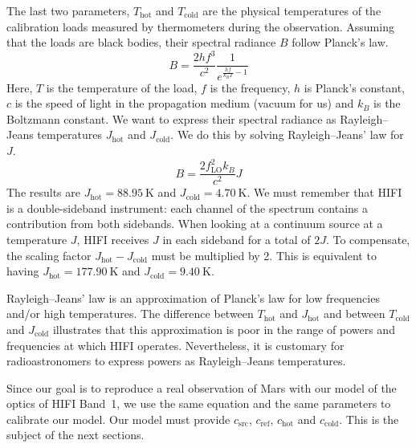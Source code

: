 The last two parameters, $T_\text{hot}$ and $T_\text{cold}$ are the physical temperatures of the calibration loads measured by thermometers during the observation.
Assuming that the loads are black bodies, their spectral radiance $B$ follow Planck's law.
\begin{equation}
    B
    =
    \frac{2 h f^3}{c^2} \frac{1}{e^{\frac{h f}{k_B T} - 1}}
    \label{eq:planck_law}
\end{equation}
Here, $T$ is the temperature of the load, $f$ is the frequency, $h$ is Planck's constant, $c$ is the speed of light in the propagation medium (vacuum for us) and $k_B$ is the Boltzmann constant.
We want to express their spectral radiance as Rayleigh--Jeans temperatures $J_\text{hot}$ and $J_\text{cold}$.
We do this by solving Rayleigh--Jeans' law for $J$.
\begin{equation}
    B
    =
    \frac{2 f_\text{LO}^2 k_B}{c^2}J
    \label{eq:rayleigh_jeans_law}
\end{equation}
The results are $J_\text{hot} = \SI{88.95}{\kelvin}$ and $J_\text{cold} = \SI{4.70}{\kelvin}$.
We must remember that HIFI is a double-sideband instrument: each channel of the spectrum contains a contribution from both sidebands.
When looking at a continuum source at a temperature $J$, HIFI receives $J$ in each sideband for a total of $2J$.
To compensate, the scaling factor $J_\text{hot} - J_\text{cold}$ must be multiplied by 2.
This is equivalent to having $J_\text{hot} = \SI{177.90}{\kelvin}$ and $J_\text{cold}=\SI{9.40}{\kelvin}$.


Rayleigh--Jeans' law is an approximation of Planck's law for low frequencies and/or high temperatures.
The difference between $T_\text{hot}$ and $J_\text{hot}$ and between $T_\text{cold}$ and $J_\text{cold}$ illustrates that this approximation is poor in the range of powers and frequencies at which HIFI operates.
Nevertheless, it is customary for radioastronomers to express powers as Rayleigh--Jeans temperatures.

Since our goal is to reproduce a real observation of Mars with our model of the optics of HIFI Band~1, we use the same equation and the same parameters to calibrate our model.
Our model must provide $c_\text{src}$, $c_\text{ref}$, $c_\text{hot}$ and $c_\text{cold}$.
This is the subject of the next sections.




